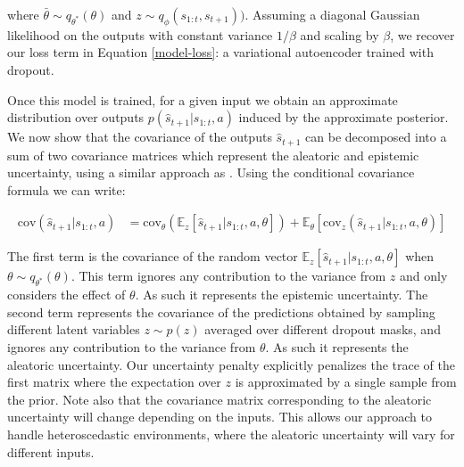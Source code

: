 \documentclass{article} %
\begin{document}
where $\bar{\theta} \sim q_{\theta^*}(\theta)$ and $z \sim q_\phi(s_{1:t}, s_{t+1}))$. Assuming a diagonal Gaussian likelihood on the outputs with constant variance $1/\beta$ and scaling by $\beta$, we recover our loss term in Equation \ref{model-loss}: a variational autoencoder trained with dropout. 

Once this model is trained, for a given input we obtain an approximate distribution over outputs $p(\hat{s}_{t+1} | s_{1:t}, a)$ induced by the approximate posterior.
We now show that the covariance of the outputs $\hat{s}_{t+1}$ can be decomposed into a sum of two covariance matrices which represent the aleatoric and epistemic uncertainty, using a similar approach as \citep{depeweg18}. 
Using the conditional covariance formula we can write:

\begin{align}
  \mbox{cov}(\hat{s}_{t+1} | s_{1:t}, a) &= \mbox{cov}_\theta(\mathbb{E}_z[\hat{s}_{t+1} | s_{1:t}, a, \theta]) + \mathbb{E}_\theta[\mbox{cov}_z(\hat{s}_{t+1} | s_{1:t}, a, \theta)]
\end{align}

The first term is the covariance of the random vector $\mathbb{E}_z[\hat{s}_{t+1} | s_{1:t}, a, \theta]$ when $\theta \sim q_{\theta^*}(\theta)$.
This term ignores any contribution to the variance from $z$ and only considers the effect of $\theta$. As such it represents the epistemic uncertainty.
The second term represents the covariance of the predictions obtained by sampling different latent variables $z \sim p(z)$ averaged over different dropout masks, and ignores any contribution to the variance from $\theta$. As such it represents the aleatoric uncertainty.
Our uncertainty penalty explicitly penalizes the trace of the first matrix where the expectation over $z$ is approximated by a single sample from the prior.
Note also that the covariance matrix corresponding to the aleatoric uncertainty will change depending on the inputs. This allows our approach to handle heteroscedastic environments, where the aleatoric uncertainty will vary for different inputs.



\end{document}
